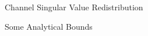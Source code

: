 \documentclass[journal]{IEEEtran}
\begin{document}
\begin{section}{Channel Singular Value Redistribution}
\begin{subsection}{Some Analytical Bounds}

	\end{subsection}

\end{section}
\end{document}
